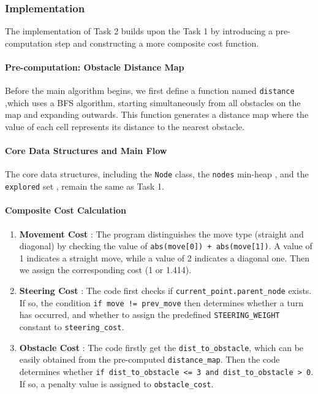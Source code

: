 \documentclass[aps,letterpaper,10pt]{revtex4}
\begin{document}
\subsubsection{Implementation}

The implementation of Task 2 builds upon the Task 1 by introducing a pre-computation step and constructing a more composite cost function.

\paragraph{Pre-computation: Obstacle Distance Map}
Before the main algorithm begins, we first define a function named \texttt{distance} ,which uses a BFS algorithm, starting simultaneously from all obstacles on the map and expanding outwards. This function generates a distance map where the value of each cell represents its distance to the nearest obstacle. 

\paragraph{Core Data Structures and Main Flow}
The core data structures, including the \texttt{Node} class, the \texttt{nodes} min-heap , and the \texttt{explored} set , remain the same as Task 1. 

\paragraph{Composite Cost Calculation}
\begin{enumerate}
    \item \textbf{Movement Cost }: The program distinguishes the move type (straight and diagonal) by checking the value of \texttt{abs(move[0]) + abs(move[1])}. A value of 1 indicates a straight move, while a value of 2 indicates a diagonal one. Then we assign the corresponding cost (1 or 1.414).
    \item \textbf{Steering Cost }: The code first checks if \texttt{current\_point.parent\_node} exists. If so, the condition \texttt{if move != prev\_move} then determines whether a turn has occurred, and whether to assign the predefined \texttt{STEERING\_WEIGHT} constant to \texttt{steering\_cost}.
    \item \textbf{Obstacle Cost }: The code firstly get the \texttt{dist\_to\_obstacle}, which can be easily obtained from the pre-computed \texttt{distance\_map}. Then the code determines whether \texttt{if dist\_to\_obstacle <= 3 and dist\_to\_obstacle > 0}. If so, a penalty value is assigned to \texttt{obstacle\_cost}.
\end{enumerate}
\end{document}
